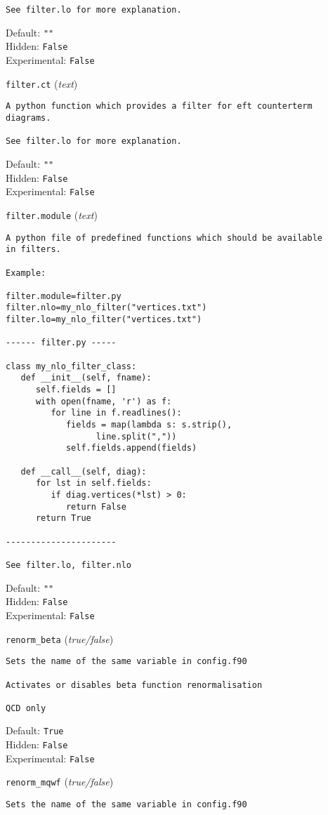 \begin{basedescript}{\desclabelstyle{\pushlabel}}
\begin{verbatim}
See filter.lo for more explanation.
\end{verbatim}
Default: \verb|""|
\\Hidden: \verb|False|
\\Experimental: \verb|False|
\\\item[\colorbox{gray!30}{\texttt{filter.ct}}] (\textit{text})
\begin{verbatim}
A python function which provides a filter for eft counterterm diagrams.

See filter.lo for more explanation.
\end{verbatim}
Default: \verb|""|
\\Hidden: \verb|False|
\\Experimental: \verb|False|
\\\item[\colorbox{gray!30}{\texttt{filter.module}}] (\textit{text})
\begin{verbatim}
A python file of predefined functions which should be available
in filters.

Example:

filter.module=filter.py
filter.nlo=my_nlo_filter("vertices.txt")
filter.lo=my_nlo_filter("vertices.txt")

------ filter.py -----

class my_nlo_filter_class:
   def __init__(self, fname):
      self.fields = []
      with open(fname, 'r') as f:
         for line in f.readlines():
            fields = map(lambda s: s.strip(),
                  line.split(","))
            self.fields.append(fields)

   def __call__(self, diag):
      for lst in self.fields:
         if diag.vertices(*lst) > 0:
            return False
      return True

----------------------

See filter.lo, filter.nlo
\end{verbatim}
Default: \verb|""|
\\Hidden: \verb|False|
\\Experimental: \verb|False|
\\\item[\colorbox{gray!30}{\texttt{renorm\_beta}}] (\textit{true/false})
\begin{verbatim}
Sets the name of the same variable in config.f90

Activates or disables beta function renormalisation

QCD only
\end{verbatim}
Default: \verb|True|
\\Hidden: \verb|False|
\\Experimental: \verb|False|
\\\item[\colorbox{gray!30}{\texttt{renorm\_mqwf}}] (\textit{true/false})
\begin{verbatim}
Sets the name of the same variable in config.f90


\end{verbatim}
\end{basedescript}
